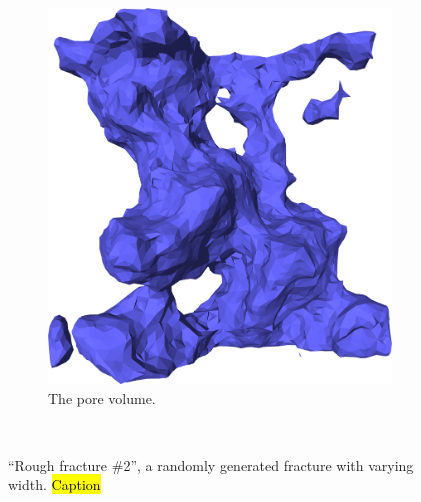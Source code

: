 \begin{figure}[!p]
\begin{subfigure}[t]{\myfigwidth}
        \includegraphics[width=\textwidth]{images/systems/trimmed-rough_fracture03_11}%
        \caption{The pore volume.}%
    \end{subfigure}%
    \vspace{10pt}\\%
    \caption{%
        ``Rough fracture \#2'', a randomly generated fracture with varying width. \hl{Caption} %
        \label{fig:renderings_rough_fracture03}%
    }%
\end{figure}%

